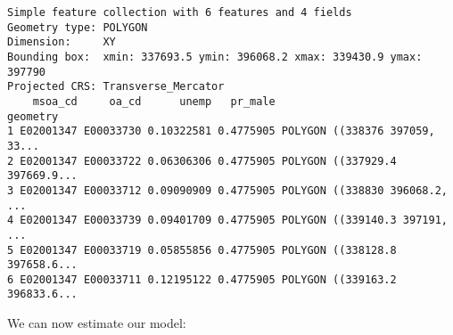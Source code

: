 \documentclass[
  letterpaper,
  krantz2]{style/krantz}
\newenvironment{Shaded}{\begin{snugshade}}{\end{snugshade}}
\newcommand{\AttributeTok}[1]{\textcolor[rgb]{0.40,0.45,0.13}{#1}}
\newcommand{\CommentTok}[1]{\textcolor[rgb]{0.37,0.37,0.37}{#1}}
\newcommand{\ConstantTok}[1]{\textcolor[rgb]{0.56,0.35,0.01}{#1}}
\newcommand{\DecValTok}[1]{\textcolor[rgb]{0.68,0.00,0.00}{#1}}
\newcommand{\FunctionTok}[1]{\textcolor[rgb]{0.28,0.35,0.67}{#1}}
\newcommand{\NormalTok}[1]{\textcolor[rgb]{0.00,0.23,0.31}{#1}}
\newcommand{\OtherTok}[1]{\textcolor[rgb]{0.00,0.23,0.31}{#1}}
\newcommand{\SpecialCharTok}[1]{\textcolor[rgb]{0.37,0.37,0.37}{#1}}
\newcommand{\StringTok}[1]{\textcolor[rgb]{0.13,0.47,0.30}{#1}}
\begin{document}
\begin{Shaded}
\end{Shaded}

\begin{verbatim}
Simple feature collection with 6 features and 4 fields
Geometry type: POLYGON
Dimension:     XY
Bounding box:  xmin: 337693.5 ymin: 396068.2 xmax: 339430.9 ymax: 397790
Projected CRS: Transverse_Mercator
    msoa_cd     oa_cd      unemp   pr_male                       geometry
1 E02001347 E00033730 0.10322581 0.4775905 POLYGON ((338376 397059, 33...
2 E02001347 E00033722 0.06306306 0.4775905 POLYGON ((337929.4 397669.9...
3 E02001347 E00033712 0.09090909 0.4775905 POLYGON ((338830 396068.2, ...
4 E02001347 E00033739 0.09401709 0.4775905 POLYGON ((339140.3 397191, ...
5 E02001347 E00033719 0.05855856 0.4775905 POLYGON ((338128.8 397658.6...
6 E02001347 E00033711 0.12195122 0.4775905 POLYGON ((339163.2 396833.6...
\end{verbatim}

We can now estimate our model:
\end{document}
